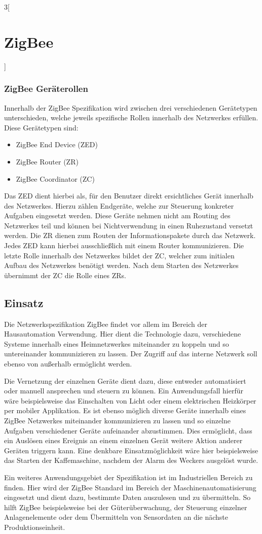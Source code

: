 \begin{multicols}{3}[\section{ZigBee}]
\subsubsection*{ZigBee Geräterollen}
Innerhalb der ZigBee Spezifikation wird zwischen drei verschiedenen Gerätetypen unterschieden, welche jeweils spezifische Rollen innerhalb des Netzwerkes erfüllen. Diese Gerätetypen sind: 
\begin{itemize}
	\item ZigBee End Device (ZED)
	\item ZigBee Router (ZR)
	\item ZigBee Coordinator (ZC)
\end{itemize}
Das ZED dient hierbei als, für den Benutzer direkt ersichtliches Gerät innerhalb des Netzwerkes. Hierzu zählen Endgeräte, welche zur Steuerung konkreter Aufgaben eingesetzt werden. Diese Geräte nehmen nicht am Routing des Netzwerkes teil und können bei Nichtverwendung in einen Ruhezustand versetzt werden. Die ZR dienen zum Routen der Informationspakete durch das Netzwerk. Jedes ZED kann hierbei ausschließlich mit einem Router kommunizieren. Die letzte Rolle innerhalb des Netzwerkes bildet der ZC, welcher zum initialen Aufbau des Netzwerkes benötigt werden. Nach dem Starten des Netzwerkes übernimmt der ZC die Rolle eines ZRs.~\cite{zigbee.10}

\subsection*{Einsatz}
Die Netzwerkspezifikation ZigBee findet vor allem im Bereich der Hausautomation Verwendung. Hier dient die Technologie dazu, verschiedene Systeme innerhalb eines Heimnetzwerkes miteinander zu koppeln und so untereinander kommunizieren zu lassen. Der Zugriff auf das interne Netzwerk soll ebenso von außerhalb ermöglicht werden. 
\par Die Vernetzung der einzelnen Geräte dient dazu, diese entweder automatisiert oder manuell ansprechen und steuern zu können. Ein Anwendungsfall hierfür wäre beispielsweise das Einschalten von Licht oder einem elektrischen Heizkörper per mobiler Applikation. Es ist ebenso möglich diverse Geräte innerhalb eines ZigBee Netzwerkes miteinander kommunizieren zu lassen und so einzelne Aufgaben verschiedener Geräte aufeinander abzustimmen. Dies ermöglicht, dass ein Auslösen eines Ereignis an einem einzelnen Gerät weitere Aktion anderer Geräten triggern kann. Eine denkbare Einsatzmöglichkeit wäre hier beispielsweise das Starten der Kaffemaschine, nachdem der Alarm des Weckers ausgelöst wurde.  
\par Ein weiteres Anwendungsgebiet der Spezifikation ist im Industriellen Bereich zu finden. Hier wird der ZigBee Standard im Bereich der Maschinenautomatisierung eingesetzt und dient dazu, bestimmte Daten auszulesen und zu übermitteln. So hilft ZigBee beispielsweise bei der Güterüberwachung, der Steuerung einzelner Anlagenelemente oder dem Übermitteln von Sensordaten an die nächste Produktionseinheit.~\cite{zigbee.10}


\end{multicols}
